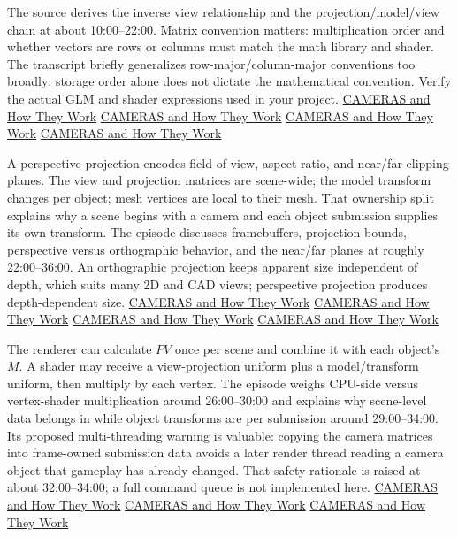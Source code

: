 The source derives the inverse view relationship and the projection/model/view chain at about 10:00--22:00. Matrix convention matters: multiplication order and whether vectors are rows or columns must match the math library and shader. The transcript briefly generalizes row-major/column-major conventions too broadly; storage order alone does not dictate the mathematical convention. Verify the actual GLM and shader expressions used in your project. \href{https://www.youtube.com/watch?v=LfbqtmqxX04&t=600s}{CAMERAS and How They Work} \href{https://www.youtube.com/watch?v=LfbqtmqxX04&t=960s}{CAMERAS and How They Work} \href{https://www.youtube.com/watch?v=LfbqtmqxX04&t=1140s}{CAMERAS and How They Work} \href{https://www.youtube.com/watch?v=LfbqtmqxX04&t=1320s}{CAMERAS and How They Work}

A perspective projection encodes field of view, aspect ratio, and near/far clipping planes. The view and projection matrices are scene-wide; the model transform changes per object; mesh vertices are local to their mesh. That ownership split explains why a scene begins with a camera and each object submission supplies its own transform. The episode discusses framebuffers, projection bounds, perspective versus orthographic behavior, and the near/far planes at roughly 22:00--36:00. An orthographic projection keeps apparent size independent of depth, which suits many 2D and CAD views; perspective projection produces depth-dependent size. \href{https://www.youtube.com/watch?v=LfbqtmqxX04&t=1320s}{CAMERAS and How They Work} \href{https://www.youtube.com/watch?v=LfbqtmqxX04&t=1560s}{CAMERAS and How They Work} \href{https://www.youtube.com/watch?v=LfbqtmqxX04&t=1800s}{CAMERAS and How They Work} \href{https://www.youtube.com/watch?v=LfbqtmqxX04&t=2100s}{CAMERAS and How They Work}

The renderer can calculate \(PV\) once per scene and combine it with each object's \(M\). A shader may receive a view-projection uniform plus a model/transform uniform, then multiply by each vertex. The episode weighs CPU-side versus vertex-shader multiplication around 26:00--30:00 and explains why scene-level data belongs in  while object transforms are per submission around 29:00--34:00. Its proposed multi-threading warning is valuable: copying the camera matrices into frame-owned submission data avoids a later render thread reading a camera object that gameplay has already changed. That safety rationale is raised at about 32:00--34:00; a full command queue is not implemented here. \href{https://www.youtube.com/watch?v=LfbqtmqxX04&t=1560s}{CAMERAS and How They Work} \href{https://www.youtube.com/watch?v=LfbqtmqxX04&t=1740s}{CAMERAS and How They Work} \href{https://www.youtube.com/watch?v=LfbqtmqxX04&t=1920s}{CAMERAS and How They Work}

